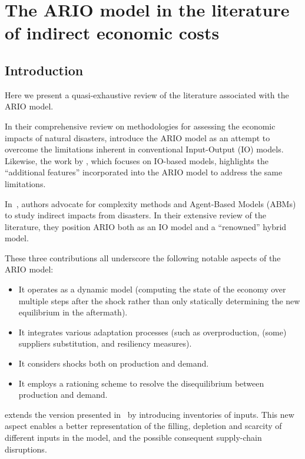 \chapter{The ARIO model in the literature of indirect economic costs}
\label{sec:descr-ario-indir}

\section{Introduction}

Here we present a quasi-exhaustive review of the literature associated
with the ARIO model.

In their comprehensive review on methodologies for assessing the economic
impacts of natural disasters, \textcite{botzen-2019-econom-impac}
introduce the ARIO model as an attempt to overcome the limitations inherent in
conventional Input-Output (IO) models. Likewise, the work by
\textcite{galbusera-2018-input-output}, which
focuses on IO-based models, highlights the ``additional features''
incorporated into the ARIO model to address the same limitations.

In~\textcite{coronese-2022-econom-impac}, authors advocate for complexity methods and
Agent-Based Models (ABMs) to study indirect impacts from disasters. In their
extensive review of the literature, they position ARIO both as an IO model and a
``renowned'' hybrid model.

These three contributions all underscore the following notable aspects of the ARIO model:
\begin{itemize}
\item It operates as a dynamic model (computing the state of the economy over multiple
steps after the shock rather than only statically determining the new
equilibrium in the aftermath).
\item It integrates various adaptation processes (such as overproduction, (some) suppliers substitution, and resiliency measures).
\item It considers shocks both on production and demand.
\item It employs a rationing scheme to resolve the disequilibrium between
production and demand.
\end{itemize}

\Textcite{hallegatte-2013-model-role} extends the version presented
in~\textcite{hallegatte-2008-adapt-region} by introducing
inventories of inputs. This new aspect enables a better representation of the filling, depletion and scarcity of
different inputs in the model, and the possible consequent supply-chain
disruptions.

